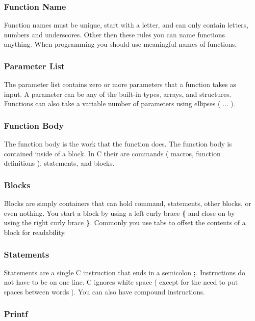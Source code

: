 \documentclass[10pt,a4paper]{paper}
\begin{document}
\subsubsection*{Function Name}
Function names must be unique, start with a letter, and can only contain letters, numbers and underscores.  Other then these rules you can name functions anything.  When programming you should use meaningful names of functions.

\subsubsection*{Parameter List }
The parameter list contains zero or more parameters that a function takes as input.  A parameter can be any of the built-in types, arrays, and structures.  Functions can also take a variable number of parameters using ellipses ( ... ). 


\subsubsection*{Function Body}

The function body is the work that the function does.  The function body is contained inside of a block.  In C their are commands ( macros, function definitions ), statements, and blocks.

\subsubsection*{Blocks}

Blocks are simply containers that can hold command, statements, other blocks, or even nothing.  You start a block by using a left curly brace \textbf{\{} and close on by using the right curly brace \textbf{\}}.  Commonly you use tabs to offset the contents of a block for readability.

\subsubsection*{Statements}

Statements are a single C instruction that ends in a semicolon \textbf{;}.
Instructions do not have to be on one line.  C ignores white space ( except for the need to put spaces between words ).  You can also have compound instructions. 

\subsubsection*{Printf}
\end{document}
